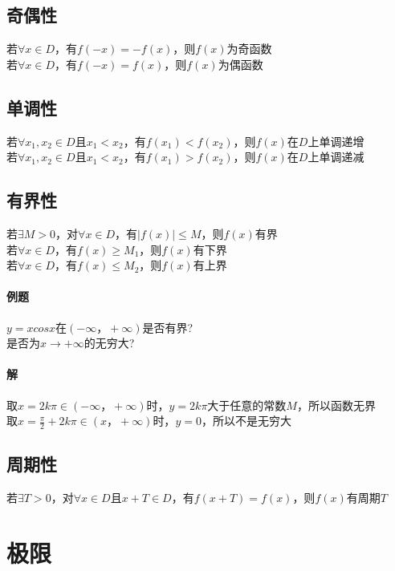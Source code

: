 \documentclass{article}
\begin{document}
\begin{flushleft}
	\subsection{奇偶性}
	若$\forall x\in D$，有$f(-x)=-f(x)$，则$f(x)$为奇函数\\
	若$\forall x\in D$，有$f(-x)=f(x)$，则$f(x)$为偶函数\\
	
	\subsection{单调性}
	若$\forall x_1,x_2\in D$且$x_1<x_2$，有$f(x_1)<f(x_2)$，则$f(x)$在$D$上单调递增\\
	若$\forall x_1,x_2\in D$且$x_1<x_2$，有$f(x_1)>f(x_2)$，则$f(x)$在$D$上单调递减\\
	
	\subsection{有界性}
	若$\exists M>0$，对$\forall x\in D$，有$|f(x)|\le M$，则$f(x)$有界\\
	\qquad 若$\forall x\in D$，有$f(x)\ge M_1$，则$f(x)$有下界\\
	\qquad 若$\forall x\in D$，有$f(x)\le M_2$，则$f(x)$有上界\\
	
	\paragraph{例题}
	$y=xcosx$在$(-\infty，+\infty)$是否有界?\\
	是否为$x\to +\infty$的无穷大?
	\paragraph{解}
	取$x=2k\pi\in(-\infty，+\infty)$时，$y=2k\pi$大于任意的常数$M$，所以函数无界\\
	取$x=\frac{\pi}{2}+2k\pi\in(x，+\infty)$时，$y=0$，所以不是无穷大\\
	
	\subsection{周期性}
	若$\exists T>0$，对$\forall x\in D$且$x+T\in D$，有$f(x+T)=f(x)$，则$f(x)$有周期$T$\\
	
	
	\section{极限}
	

\end{flushleft}
\end{document}
